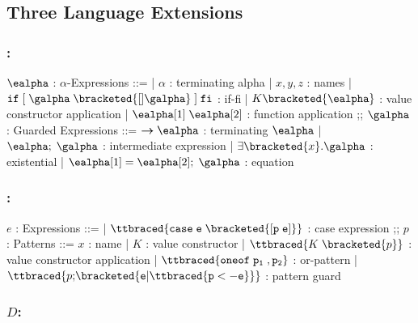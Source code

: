 \documentclass[]{article}
\begin{document}
\subsection{Three Language Extensions}

\subsubsection{\Vminus:}

\begin{center}
    \begin{bnf}
    $\ealpha$ : \textsf{$\alpha$-Expressions} ::=
    | $\alpha$ : terminating alpha
    | $x, y, z$ : names
    | $\tt{if} \; \tt{[}\; \galpha \; \bracketed{[] \galpha} \;\tt{]} \; \tt{fi}$ : if-fi 
    | $K \bracketed{\ealpha}$ : value constructor application 
    | $\ealpha[1] \; \ealpha[2]$ : function application 
    ;;
    $\galpha$ : \textsf{Guarded Expressions} ::=  
    $\boldsymbol{\rightarrow}\ealpha$ : terminating $\ealpha$ 
    | $\ealpha; \; \galpha$ : intermediate expression 
    | $\exists \bracketed{x} \tt{.} \galpha$ : existential 
    | $\ealpha[1] = \ealpha[2]; \; \galpha$ : equation 
    \end{bnf}
\end{center}

\bigskip 

\subsubsection{\Pplus:}
\begin{center}
    \begin{bnf}
$e$ : \textsf{Expressions} ::=
    | $\ttbraced{\tt{case} \; e \; \bracketed{\tt{[} p \; e \tt{]}}}$ : case expression 
    ;;
    $p$ : \textsf{Patterns} ::= $x$ : name 
    | $K$ : value constructor 
    | $\ttbraced{K \; \bracketed{p}}$ : value constructor application 
    | $\ttbraced{\tt{oneof} \; p_{1} \;, p_{2} }$ : or-pattern 
    | $\ttbraced{p \tt{;} \bracketed{e \vert \ttbraced{p  <- e}}}$ : pattern guard
    \end{bnf}
\end{center}


\bigskip 

\subsubsection{$D$:}
\end{document}
